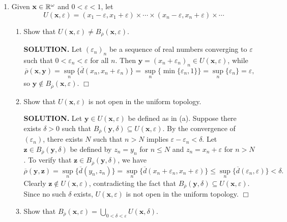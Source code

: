 \documentclass{article}
\begin{document}
\begin{enumerate}
    \item Given $\mathbf{x} \in \mathbb{R}^\omega$ and $0 < \varepsilon < 1$, let
    $$U(\mathbf{x}, \varepsilon) = (x_1 - \varepsilon, x_1 + \varepsilon) \times \cdots \times (x_n - \varepsilon, x_n + \varepsilon) \times \cdots$$
    \begin{enumerate}
        \item Show that $U(\mathbf{x}, \varepsilon) \neq B_{\overline{\rho}}(\mathbf{x}, \varepsilon)$.

        {\bf SOLUTION.} Let $(\varepsilon_n)_n$ be a sequence of real numbers converging to $\varepsilon$ such that $0 < \varepsilon_n < \varepsilon$ for all $n$. Then $\mathbf{y} = (x_n + \varepsilon_n)_n \in U(\mathbf{x}, \varepsilon)$, while 
        $$\overline{\rho}(\mathbf{x}, \mathbf{y}) = \sup_n\{\overline{d}(x_n, x_n + \varepsilon_n)\} = \sup_n\{\min\{\varepsilon_n, 1\}\} = \sup_n \{\varepsilon_n\} = \varepsilon,$$
        so $\mathbf{y} \notin B_{\overline{\rho}}(\mathbf{x}, \varepsilon)$. $\Box$

        \item Show that $U(\mathbf{x}, \varepsilon)$ is not open in the uniform topology.

        {\bf SOLUTION.} Let $\mathbf{y} \in U(\mathbf{x}, \varepsilon)$ be defined as in (a). Suppose there exists $\delta > 0$ such that $B_{\overline{\rho}}(\mathbf{y}, \delta) \subseteq U(\mathbf{x}, \varepsilon)$. By the convergence of $(\varepsilon_n)$, there exists $N$ such that $n > N$ implies $\varepsilon - \varepsilon_n < \delta$. Let $\mathbf{z} \in B_{\overline{\rho}}(\mathbf{y}, \delta)$ be defined by $z_n = y_n$ for $n \leq N$ and $z_n = x_n + \varepsilon$ for $n > N$. To verify that $\mathbf{z} \in B_{\overline{\rho}}(\mathbf{y}, \delta)$, we have
        $$\overline{\rho}(\mathbf{y}, \mathbf{z}) = \sup_n \{\overline{d}(y_n, z_n)\} = \sup_n \{\overline{d}(x_n + \varepsilon_n, x_n + \varepsilon)\} \leq \sup_n \{\overline{d}(\varepsilon_n, \varepsilon)\} < \delta.$$
        Clearly $\mathbf{z} \notin U(\mathbf{x}, \varepsilon)$, contradicting the fact that $B_{\overline{\rho}}(\mathbf{y}, \delta) \subseteq U(\mathbf{x}, \varepsilon)$. Since no such $\delta$ exists, $U(\mathbf{x}, \varepsilon)$ is not open in the uniform topology. $\Box$

        \item Show that $B_{\overline{\rho}}(\mathbf{x}, \varepsilon) = \bigcup_{0 < \delta < \varepsilon} U(\mathbf{x}, \delta)$.


\end{enumerate}
\end{enumerate}
\end{document}
